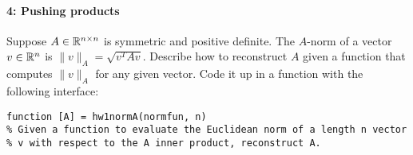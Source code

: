\documentclass[12pt, leqno]{article}
\begin{document}
\paragraph*{4: Pushing products}
Suppose $A \in \mathbb{R}^{n \times n}$ is symmetric and positive definite.  The $A$-norm of a
vector $v \in \mathbb{R}^{n}$ is $\|v\|_A = \sqrt{v^T A v}$.  Describe how to reconstruct
$A$ given a function that computes $\|v\|_A$ for any given vector.
Code it up in a function with the following interface:
\begin{lstlisting}
function [A] = hw1normA(normfun, n)
% Given a function to evaluate the Euclidean norm of a length n vector
% v with respect to the A inner product, reconstruct A.
\end{lstlisting}
\end{document}
